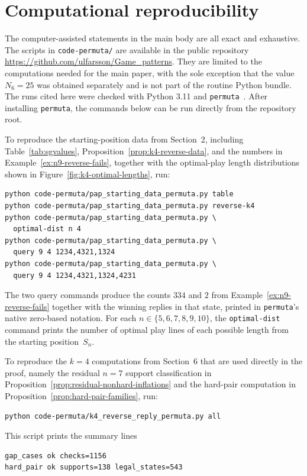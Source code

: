 \documentclass[11pt]{amsart}
\newcommand{\Sym}{S}
\theoremstyle{plain}
\theoremstyle{definition}
\theoremstyle{remark}
\begin{document}
\appendix

\section{Computational reproducibility}\label{sec:repro}

The computer-assisted statements in the main body are all exact and exhaustive.  The scripts in
\texttt{code-permuta/} are available in the public repository
\url{https://github.com/ulfarsson/Game_patterns}.  They are limited to the computations needed for
the main paper, with the sole exception that the value $N_6=25$ was obtained separately and
is not part of the routine Python bundle.  The runs cited here were checked with Python 3.11 and
\texttt{permuta}~\cite{permuta-repo}.  After installing \texttt{permuta}, the commands below can
be run directly from the repository root.

To reproduce the starting-position data from Section~2, including Table~\ref{tab:sgvalues},
Proposition~\ref{prop:k4-reverse-data}, and the numbers in
Example~\ref{ex:n9-reverse-fails}, together with the optimal-play length distributions shown in
Figure~\ref{fig:k4-optimal-lengths}, run:
\begin{verbatim}
python code-permuta/pap_starting_data_permuta.py table
python code-permuta/pap_starting_data_permuta.py reverse-k4
python code-permuta/pap_starting_data_permuta.py \
  optimal-dist n 4
python code-permuta/pap_starting_data_permuta.py \
  query 9 4 1234,4321,1324
python code-permuta/pap_starting_data_permuta.py \
  query 9 4 1234,4321,1324,4231
\end{verbatim}
The two query commands produce the counts $334$ and $2$ from
Example~\ref{ex:n9-reverse-fails} together with the
winning replies in that state, printed in \texttt{permuta}'s native zero-based notation.  For each
$n \in \{5,6,7,8,9,10\}$, the \texttt{optimal-dist} command prints the number of optimal play
lines of each possible length from the starting position~$\Sym_n$.

To reproduce the $k=4$ computations from Section~6 that are used directly in the proof,
namely the residual $n=7$ support classification in
Proposition~\ref{prop:residual-nonhard-inflations} and the hard-pair computation in
Proposition~\ref{prop:hard-pair-families}, run:
\begin{verbatim}
python code-permuta/k4_reverse_reply_permuta.py all
\end{verbatim}
This script prints the summary lines
\begin{verbatim}
gap_cases ok checks=1156
hard_pair ok supports=138 legal_states=543
\end{verbatim}
\end{document}
